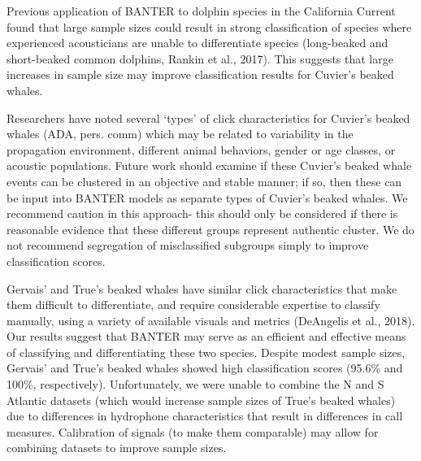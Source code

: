 \documentclass[
  authoryear,
  preprint,
  3p]{elsarticle}
\begin{document}
Previous application of BANTER to dolphin species in the California
Current found that large sample sizes could result in strong
classification of species where experienced acousticians are unable to
differentiate species (long-beaked and short-beaked common dolphins,
Rankin et al., 2017). This suggests that large increases in sample size
may improve classification results for Cuvier's beaked whales.

Researchers have noted several `types' of click characteristics for
Cuvier's beaked whales (ADA, pers. comm) which may be related to
variability in the propagation environment, different animal behaviors,
gender or age classes, or acoustic populations. Future work should
examine if these Cuvier's beaked whale events can be clustered in an
objective and stable manner; if so, then these can be input into BANTER
models as separate types of Cuvier's beaked whales. We recommend caution
in this approach- this should only be considered if there is reasonable
evidence that these different groups represent authentic cluster. We do
not recommend segregation of misclassified subgroups simply to improve
classification scores.

Gervais' and True's beaked whales have similar click characteristics
that make them difficult to differentiate, and require considerable
expertise to classify manually, using a variety of available visuals and
metrics (DeAngelis et al., 2018). Our results suggest that BANTER may
serve as an efficient and effective means of classifying and
differentiating these two species. Despite modest sample sizes, Gervais'
and True's beaked whales showed high classification scores (95.6\% and
100\%, respectively). Unfortunately, we were unable to combine the N and
S Atlantic datasets (which would increase sample sizes of True's beaked
whales) due to differences in hydrophone characteristics that result in
differences in call measures. Calibration of signals (to make them
comparable) may allow for combining datasets to improve sample sizes.
\end{document}
